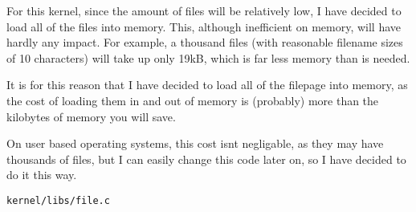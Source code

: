 \documentclass{article}
\begin{document}
For this kernel, since the amount of files will be relatively low, I have decided
to load all of the files into memory. This, although inefficient on memory, will have
hardly any impact. For example, a thousand files (with reasonable filename sizes of 10
characters) will take up only 19kB, which is far less memory than is needed.

It is for this reason that I have decided to load all of the filepage into memory, as
the cost of loading them in and out of memory is (probably) more than the kilobytes of
memory you will save.

On user based operating systems, this cost isnt negligable, as they may have thousands of
files, but I can easily change this code later on, so I have decided to do it this way.

\begin{verbatim}
kernel/libs/file.c
\end{verbatim}
\end{document}
